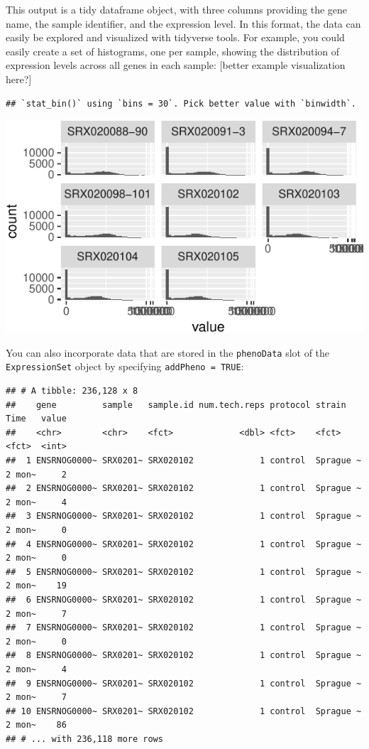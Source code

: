 \documentclass[]{tufte-book}
\begin{document}
This output is a tidy dataframe object, with three columns providing the
gene name, the sample identifier, and the expression level. In this format,
the data can easily be explored and visualized with tidyverse tools. For example,
you could easily create a set of histograms, one per sample, showing the
distribution of expression levels across all genes in each sample:
{[}better example visualization here?{]}

\begin{verbatim}
## `stat_bin()` using `bins = 30`. Pick better value with `binwidth`.
\end{verbatim}

\includegraphics{improve_repro_files/figure-latex/unnamed-chunk-10-1}

You can also incorporate data that are stored in the \texttt{phenoData} slot of
the \texttt{ExpressionSet} object by specifying \texttt{addPheno\ =\ TRUE}:

\begin{verbatim}
## # A tibble: 236,128 x 8
##    gene         sample   sample.id num.tech.reps protocol strain    Time   value
##    <chr>        <chr>    <fct>             <dbl> <fct>    <fct>     <fct>  <int>
##  1 ENSRNOG0000~ SRX0201~ SRX020102             1 control  Sprague ~ 2 mon~     2
##  2 ENSRNOG0000~ SRX0201~ SRX020102             1 control  Sprague ~ 2 mon~     4
##  3 ENSRNOG0000~ SRX0201~ SRX020102             1 control  Sprague ~ 2 mon~     0
##  4 ENSRNOG0000~ SRX0201~ SRX020102             1 control  Sprague ~ 2 mon~     0
##  5 ENSRNOG0000~ SRX0201~ SRX020102             1 control  Sprague ~ 2 mon~    19
##  6 ENSRNOG0000~ SRX0201~ SRX020102             1 control  Sprague ~ 2 mon~     7
##  7 ENSRNOG0000~ SRX0201~ SRX020102             1 control  Sprague ~ 2 mon~     0
##  8 ENSRNOG0000~ SRX0201~ SRX020102             1 control  Sprague ~ 2 mon~     4
##  9 ENSRNOG0000~ SRX0201~ SRX020102             1 control  Sprague ~ 2 mon~     7
## 10 ENSRNOG0000~ SRX0201~ SRX020102             1 control  Sprague ~ 2 mon~    86
## # ... with 236,118 more rows
\end{verbatim}
\end{document}
